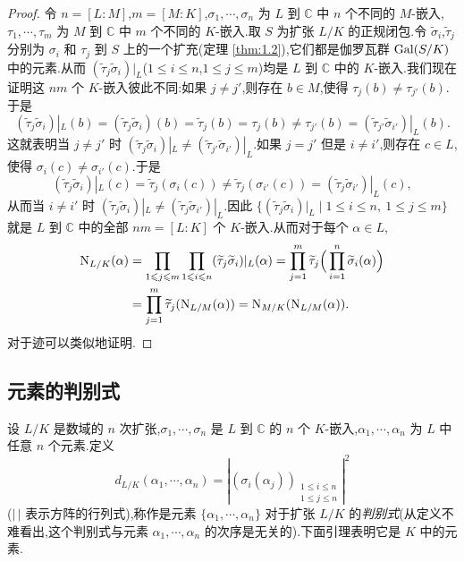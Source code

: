 \begin{proof}
令 $n=[L:M]$,$m=[M:K]$,$\sigma_1,\cdots,\sigma_n$ 为 $L$ 到 $\mathbb{C}$ 中 $n$ 个不同的 $M$-嵌入,$\tau_1,\cdots,\tau_m$ 为 $M$ 到 $\mathbb{C}$ 中 $m$ 个不同的 $K$-嵌入.取 $S$ 为扩张 $L/K$ 的正规闭包.令 $\widetilde{\sigma}_i$,$\widetilde{\tau}_j$ 分别为 $\sigma_i$ 和 $\tau_j$ 到 $S$ 上的一个扩充(定理 \ref{thm:1.2}),它们都是伽罗瓦群 $\operatorname{Gal}(S/K)$ 中的元素.从而 $(\widetilde{\tau}_j\widetilde{\sigma}_i)|_L$($1\leqslant i\leqslant n$,$1\leqslant j\leqslant m$)均是 $L$ 到 $\mathbb{C}$ 中的 $K$-嵌入.我们现在证明这 $nm$ 个 $K$-嵌入彼此不同:如果 $j\neq j'$,则存在 $b\in M$,使得 $\tau_j(b)\neq\tau_{j'}(b)$.于是
\[
  (\widetilde{\tau}_j\widetilde{\sigma}_i)|_L(b)=(\widetilde{\tau}_j\widetilde{\sigma}_i)(b)=\widetilde{\tau}_j(b)=\tau_j(b)\neq\tau_{j'}(b)=(\widetilde{\tau}_{j'}\widetilde{\sigma}_{i'})|_L(b).
\]
这就表明当 $j\neq j'$ 时 $(\widetilde{\tau}_j\widetilde{\sigma}_i)|_L\neq(\widetilde{\tau}_{j'}\widetilde{\sigma}_{i'})|_L$.如果 $j=j'$ 但是 $i\neq i'$,则存在 $c\in L$,使得 $\sigma_i(c)\neq\sigma_{i'}(c)$.于是
\[
  (\widetilde{\tau}_j\widetilde{\sigma}_i)|_L(c)=\widetilde{\tau}_j(\sigma_i(c))\neq\widetilde{\tau}_j(\sigma_{i'}(c))=(\widetilde{\tau}_j\widetilde{\sigma}_{i'})|_L(c),
\]
从而当 $i\neq i'$ 时 $(\widetilde{\tau}_j\widetilde{\sigma}_i)|_L\neq(\widetilde{\tau}_j\widetilde{\sigma}_{i'})|_L$.因此 $\{(\widetilde{\tau}_j\widetilde{\sigma}_i)|_L\mid 1\leqslant i\leqslant n,\ 1\leqslant j\leqslant m\}$ 就是 $L$ 到 $\mathbb{C}$ 中的全部 $nm=[L:K]$ 个 $K$-嵌入.从而对于每个 $\alpha\in L$,
\begin{align*}
  \mathrm{N}_{L/K}(\alpha)
  &=\prod_{1\leqslant j\leqslant m}\prod_{1\leqslant i\leqslant n}(\widetilde{\tau}_j\widetilde{\sigma}_i)|_L(\alpha)
   =\prod_{j=1}^{m}\widetilde{\tau}_j\Big(\prod_{i=1}^{n}\widetilde{\sigma}_i(\alpha)\Big)\\
  &=\prod_{j=1}^{m}\widetilde{\tau}_j(\mathrm{N}_{L/M}(\alpha))
   =\mathrm{N}_{M/K}(\mathrm{N}_{L/M}(\alpha)).
\end{align*}
对于迹可以类似地证明.
\end{proof}

\subsection{元素的判别式}\label{sec:ch1-s1-4}

设 $L/K$ 是数域的 $n$ 次扩张,$\sigma_1,\cdots,\sigma_n$ 是 $L$ 到 $\mathbb{C}$ 的 $n$ 个 $K$-嵌入,$\alpha_1,\cdots,\alpha_n$ 为 $L$ 中任意 $n$ 个元素.定义
\[
  d_{L/K}(\alpha_1,\cdots,\alpha_n)
  =\left|(\sigma_i(\alpha_j))_{\substack{1\leqslant i\leqslant n\\ 1\leqslant j\leqslant n}}\right|^2
\]
($|\,|$ 表示方阵的行列式),称作是元素 $\{\alpha_1,\cdots,\alpha_n\}$ 对于扩张 $L/K$ 的\emph{判别式}(从定义不难看出,这个判别式与元素 $\alpha_1,\cdots,\alpha_n$ 的次序是无关的).下面引理表明它是 $K$ 中的元素.

